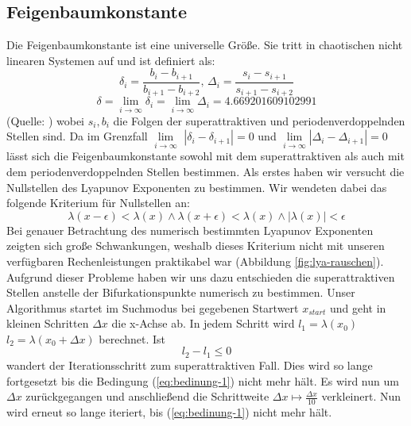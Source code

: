 \documentclass[12pt,a4paper]{article}
\begin{document}
\subsection{Feigenbaumkonstante}
Die Feigenbaumkonstante ist eine universelle Größe. Sie tritt in chaotischen nicht linearen Systemen auf und ist definiert als:
\begin{equation}\delta_i = \frac{b_i-b_{i+1}}{b_{i+1}-b_{i+2}}\text{, }\Delta_i=\frac{s_i-s_{i+1}}{s_{i+1}-s_{i+2}}\end{equation}
\begin{equation}\delta = \lim\limits_{i \rightarrow \infty}{\delta_i}= \lim\limits_{i \rightarrow \infty}{\Delta_i} = 4.669201609102991\end{equation} 
(Quelle: \parencite{feigenbaum})
wobei $s_i, b_i$ die Folgen der superattraktiven und periodenverdoppelnden Stellen sind.
Da im Grenzfall $\lim\limits_{i \rightarrow \infty}$ $|\delta_i - \delta_{i+1}|=0$ und $\lim\limits_{i \rightarrow \infty} |\Delta_i - \Delta_{i+1}|=0$  lässt sich die Feigenbaumkonstante sowohl mit dem superattraktiven als auch mit dem periodenverdoppelnden Stellen bestimmen. 
Als erstes haben wir versucht die Nullstellen des Lyapunov Exponenten zu bestimmen. Wir wendeten dabei das folgende Kriterium für Nullstellen an:
\begin{equation}
\lambda(x-\epsilon) < \lambda(x) \wedge \lambda(x+\epsilon) < \lambda(x) \wedge |\lambda(x)|<\epsilon
\end{equation}
Bei genauer Betrachtung des numerisch bestimmten Lyapunov Exponenten zeigten sich große Schwankungen, weshalb dieses Kriterium nicht mit unseren verfügbaren Rechenleistungen praktikabel war (Abbildung \ref{fig:lya-rauschen}).
Aufgrund dieser Probleme
haben wir uns dazu entschieden die superattraktiven Stellen anstelle der Bifurkationspunkte numerisch zu bestimmen. Unser Algorithmus startet im Suchmodus bei gegebenen Startwert $x_{start}$ und geht in kleinen Schritten $\Delta x$ die x-Achse ab. In jedem Schritt wird $l_1=\lambda(x_0)$ $l_2=\lambda(x_0 + \Delta x)$ berechnet. 
Ist
\begin{equation}
l_2-l_1 \leq 0 
\label{eq:bedinung-1}
\end{equation}
wandert der Iterationsschritt zum superattraktiven Fall. 
Dies wird so lange fortgesetzt bis die Bedingung (\ref{eq:bedinung-1}) nicht mehr hält. 
Es wird nun um $\Delta x$ zurückgegangen und anschließend die Schrittweite $\Delta x \mapsto \frac{\Delta x}{10} $ verkleinert. Nun wird erneut so lange iteriert, bis (\ref{eq:bedinung-1}) nicht mehr hält. 
\end{document}

